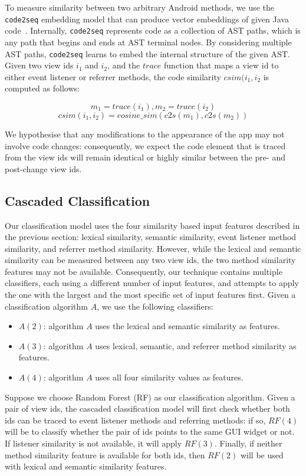 \documentclass[sigconf]{acmart}
\begin{document}
To measure similarity between two arbitrary Android methods, we use the
\texttt{code2seq} embedding model that can produce vector embeddings of given
Java code~\cite{Alon2019ty}. Internally, \texttt{code2seq} represents code as
a collection of AST paths, which is any path that begins and ends at AST
terminal nodes. By considering multiple AST paths, \texttt{code2seq} learns to
embed the internal structure of the given AST. Given two view ids $i_1$ and $i_2$, and the $trace$ function that maps a view id to either event listener or referrer methods, the code similarity $csim(i_1, i_2$ is computed as follows:

\[m_1 = trace(i_1), m_2 = trace(i_2)\]
\[csim(i_1, i_2) = cosine\_sim(c2s(m_1), c2s(m_2))\]

We hypothesise that any modifications to the appearance of the app may not
involve code changes: consequently, we expect the code element that is traced
from the view ids will remain identical or highly similar between the
pre- and post-change view ids.

\subsection{Cascaded Classification}
\label{sec:cascade}

Our classification model uses the four similarity based input features
described in the previous section: lexical similarity, semantic similarity,
event listener method similarity, and referrer method similarity. However,
while the lexical and semantic similarity can be measured between any two view
ids, the two method similarity features may not be available. Consequently,
our technique contains multiple classifiers, each using a different number of
input features, and attempts to apply the one with the largest and the most
specific set of input features first. Given a classification algorithm $A$, we use the following classifiers:

\begin{itemize}
  \item $A(2)$: algorithm $A$ uses the lexical and semantic similarity as features.
  \item $A(3)$: algorithm $A$ uses lexical, semantic, and referrer method similarity as features.
  \item $A(4)$: algorithm $A$ uses all four similarity values as features.
\end{itemize}

Suppose we choose Random Forest (RF) as our classification algorithm. Given a
pair of view ids, the cascaded classification model will first check whether
both ids can be traced to event listener methods and referring methods: if so,
$RF(4)$ will be to classify whether the pair of ids points to the same GUI
widget or not. If listener similarity is not available, it will apply $RF(3)$.
Finally, if neither method similarity feature is available for both ids, then $
  RF(2)$ will be used with lexical and semantic similarity features.
\end{document}
